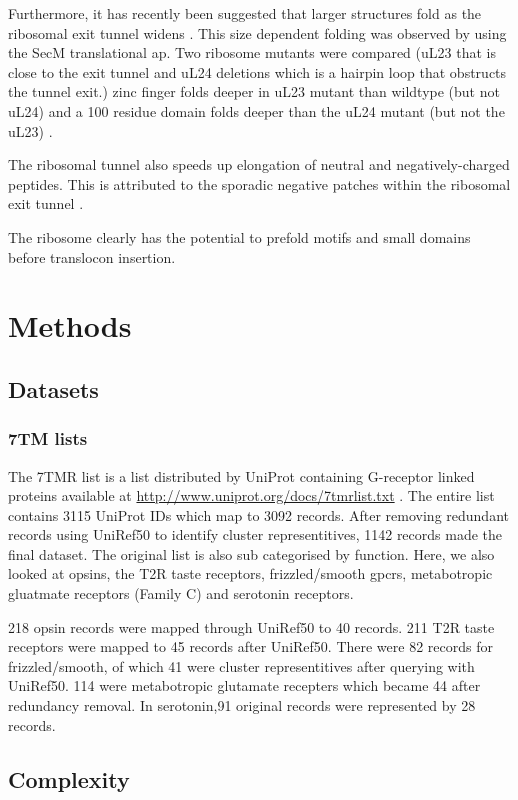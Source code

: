 Furthermore, it has recently been suggested that larger structures fold as the ribosomal exit tunnel widens \cite{Kudva2018}.
This size dependent folding was observed by using the SecM translational \gls{ap}.
Two ribosome mutants were compared (uL23 that is close to the exit tunnel and uL24 deletions which is a hairpin loop that obstructs the tunnel exit.) zinc finger folds deeper in uL23 mutant than wildtype (but not uL24) and a 100 residue domain folds deeper than the uL24 mutant (but not the uL23) \cite{Kudva2018}.

The ribosomal tunnel also speeds up elongation of neutral and negatively-charged peptides.
This is attributed to the sporadic negative patches within the ribosomal exit tunnel \cite{Lu2008}.

The ribosome clearly has the potential to prefold motifs and small domains before translocon insertion.

\section{Methods}
\subsection{Datasets}
\subsubsection{7TM lists}
The 7TMR list is a list distributed by UniProt containing G-receptor linked proteins available at \url{http://www.uniprot.org/docs/7tmrlist.txt} \cite{TheUniProtConsortium2014}.
The entire list contains 3115 UniProt IDs which map to 3092 records.
After removing redundant records using UniRef50 to identify cluster representitives, 1142 records made the final dataset.
The original list is also sub categorised by function.
Here, we also looked at opsins, the T2R taste receptors, frizzled/smooth \gls{gpcr}s, metabotropic gluatmate receptors (Family C) and serotonin receptors.

218 opsin records were mapped through UniRef50 to 40 records.
211 T2R taste receptors were mapped to 45 records after UniRef50.
There were 82 records for frizzled/smooth, of which 41 were cluster representitives after querying with UniRef50.
114 were metabotropic glutamate recepters which became 44 after redundancy removal.
In serotonin,91 original records were represented by 28 records.



\subsection{Complexity}
